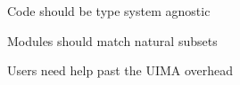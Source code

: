 \documentclass[final]{beamer}
\begin{document}
\begin{frame}{}
\begin{columns}[t]
\begin{column}{.45\linewidth}
  \end{column}


  \begin{column}{.45\linewidth}
    \begin{block}{Code should be type system agnostic}
    \end{block}

    \begin{block}{Modules should match natural subsets}
    \end{block}

    \begin{block}{Users need help past the UIMA overhead}
    \end{block}
    
   
  \end{column}

\end{columns}
\vfill
\end{frame}
\end{document}

